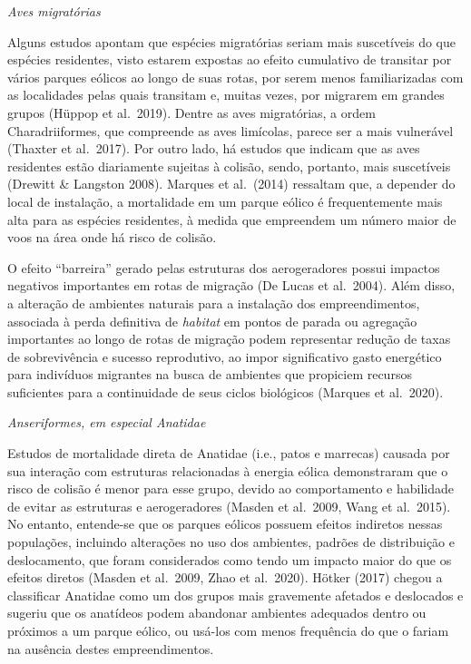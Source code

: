 \documentclass[
  oneside]{scrbook}
\begin{document}
\emph{Aves migratórias}

Alguns estudos apontam que espécies migratórias seriam mais suscetíveis do que espécies residentes, visto estarem expostas ao efeito cumulativo de transitar por vários parques eólicos ao longo de suas rotas, por serem menos familiarizadas com as localidades pelas quais transitam e, muitas vezes, por migrarem em grandes grupos (Hüppop et al.~2019). Dentre as aves migratórias, a ordem Charadriiformes, que compreende as aves limícolas, parece ser a mais vulnerável (Thaxter et al.~2017). Por outro lado, há estudos que indicam que as aves residentes estão diariamente sujeitas à colisão, sendo, portanto, mais suscetíveis (Drewitt \& Langston 2008). Marques et al.~(2014) ressaltam que, a depender do local de instalação, a mortalidade em um parque eólico é frequentemente mais alta para as espécies residentes, à medida que empreendem um número maior de voos na área onde há risco de colisão.

O efeito ``barreira'' gerado pelas estruturas dos aerogeradores possui impactos negativos importantes em rotas de migração (De Lucas et al.~2004). Além disso, a alteração de ambientes naturais para a instalação dos empreendimentos, associada à perda definitiva de \emph{habitat} em pontos de parada ou agregação importantes ao longo de rotas de migração podem representar redução de taxas de sobrevivência e sucesso reprodutivo, ao impor significativo gasto energético para indivíduos migrantes na busca de ambientes que propiciem recursos suficientes para a continuidade de seus ciclos biológicos (Marques et al.~2020).

\emph{Anseriformes, em especial Anatidae}

Estudos de mortalidade direta de Anatidae (i.e., patos e marrecas) causada por sua interação com estruturas relacionadas à energia eólica demonstraram que o risco de colisão é menor para esse grupo, devido ao comportamento e habilidade de evitar as estruturas e aerogeradores (Masden et al.~2009, Wang et al.~2015). No entanto, entende-se que os parques eólicos possuem efeitos indiretos nessas populações, incluindo alterações no uso dos ambientes, padrões de distribuição e deslocamento, que foram considerados como tendo um impacto maior do que os efeitos diretos (Masden et al.~2009, Zhao et al.~2020). Hötker (2017) chegou a classificar Anatidae como um dos grupos mais gravemente afetados e deslocados e sugeriu que os anatídeos podem abandonar ambientes adequados dentro ou próximos a um parque eólico, ou usá-los com menos frequência do que o fariam na ausência destes empreendimentos.
\end{document}
